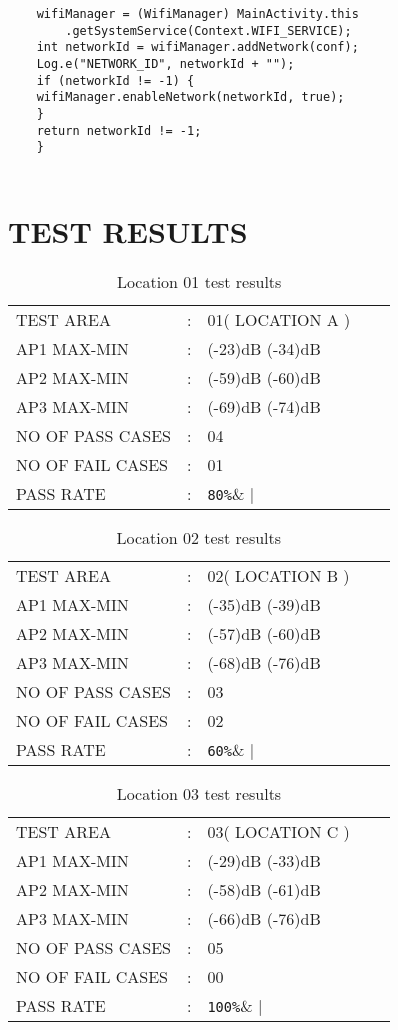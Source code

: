 \documentclass{report}
\begin{document}
\begin{lstlisting}
	wifiManager = (WifiManager) MainActivity.this
		.getSystemService(Context.WIFI_SERVICE);
	int networkId = wifiManager.addNetwork(conf);
	Log.e("NETWORK_ID", networkId + "");
	if (networkId != -1) {
	wifiManager.enableNetwork(networkId, true);
	}
	return networkId != -1;
	}
	
	\end{lstlisting}
	
	\chapter{TEST RESULTS}
	\begin{table}[H]
		\centering
		\label{LOCATION ONE TEST}
		\begin{tabular}{lllll}
			TEST AREA& :&  01( LOCATION A )&    \\
			AP1 MAX-MIN& :& (-23)dB (-34)dB&  \\
			AP2 MAX-MIN& :& (-59)dB (-60)dB&   \\
			AP3 MAX-MIN& :& (-69)dB (-74)dB&   \\
			NO OF PASS CASES& :& 04&  \\
			NO OF FAIL CASES& :& 01&   \\
			PASS RATE& :& \verb|80%|&   
		\end{tabular}
		\caption{Location 01 test results}
	\end{table} 
	
	\begin{table}[H]
		\centering
		\label{LOCATION TWO TEST}
		\begin{tabular}{lllll}
			TEST AREA& :&  02( LOCATION B )&    \\
			AP1 MAX-MIN& :& (-35)dB (-39)dB&  \\
			AP2 MAX-MIN& :& (-57)dB (-60)dB&   \\
			AP3 MAX-MIN& :& (-68)dB (-76)dB&   \\
			NO OF PASS CASES& :& 03&  \\
			NO OF FAIL CASES& :& 02&   \\
			PASS RATE& :& \verb|60%|&   
		\end{tabular}
		\caption{Location 02 test results}
	\end{table} 
	
	\begin{table}[H]
		\centering
		\label{LOCATION THREE TEST}
		\begin{tabular}{lllll}
			TEST AREA& :&  03( LOCATION C )&    \\
			AP1 MAX-MIN& :& (-29)dB (-33)dB&  \\
			AP2 MAX-MIN& :& (-58)dB (-61)dB&   \\
			AP3 MAX-MIN& :& (-66)dB (-76)dB&   \\
			NO OF PASS CASES& :& 05&  \\
			NO OF FAIL CASES& :& 00&   \\
			PASS RATE& :& \verb|100%|&   
		\end{tabular}
		\caption{Location 03 test results}
	\end{table} 
	
\end{document}
